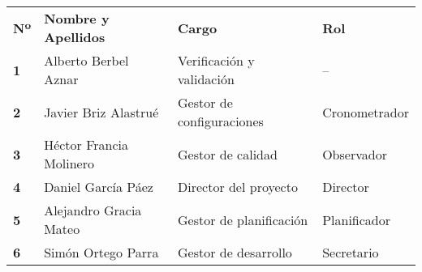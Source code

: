 \begin{longtable}{ | C{\tabcolsep} |
                     L{\tabcolsep} |
                     C{\tabcolsep} |
                     C{\tabcolsep} | }
\hline %
 \\
\hline %
{\bf Nº} & {\bf Nombre y Apellidos} & {\bf Cargo} & {\bf Rol} \\
\hline %
{\bf 1} & Alberto Berbel Aznar & Verificación y validación & --  \\
\hline %
{\bf 2} & Javier Briz Alastrué & Gestor de configuraciones & Cronometrador  \\
\hline %
{\bf 3} & Héctor Francia Molinero & Gestor de calidad & Observador  \\
\hline %
{\bf 4} & Daniel García Páez & Director del proyecto & Director \\
\hline %
{\bf 5} & Alejandro Gracia Mateo & Gestor de planificación & Planificador \\
\hline %
{\bf 6} & Simón Ortego Parra & Gestor de desarrollo & Secretario \\
\hline %
\end{longtable}

